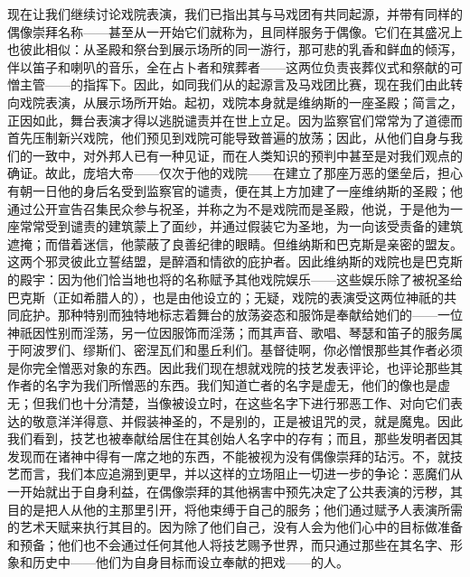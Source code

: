 现在让我们继续讨论戏院表演，我们已指出其与马戏团有共同起源，并带有同样的偶像崇拜名称——甚至从一开始它们就称为，且同样服务于偶像。它们在其盛况上也彼此相似：从圣殿和祭台到展示场所的同一游行，那可悲的乳香和鲜血的倾泻，伴以笛子和喇叭的音乐，全在占卜者和殡葬者——这两位负责丧葬仪式和祭献的可憎主管——的指挥下。因此，如同我们从的起源言及马戏团比赛，现在我们由此转向戏院表演，从展示场所开始。起初，戏院本身就是维纳斯的一座圣殿；简言之，正因如此，舞台表演才得以逃脱谴责并在世上立足。因为监察官们常常为了道德而首先压制新兴戏院，他们预见到戏院可能导致普遍的放荡；因此，从他们自身与我们的一致中，对外邦人已有一种见证，而在人类知识的预判中甚至是对我们观点的确证。故此，庞培大帝——仅次于他的戏院——在建立了那座万恶的堡垒后，担心有朝一日他的身后名受到监察官的谴责，便在其上方加建了一座维纳斯的圣殿；他通过公开宣告召集民众参与祝圣，并称之为不是戏院而是圣殿，他说，于是他为一座常常受到谴责的建筑蒙上了面纱，并通过假装它为圣地，为一向该受责备的建筑遮掩；而借着迷信，他蒙蔽了良善纪律的眼睛。但维纳斯和巴克斯是亲密的盟友。这两个邪灵彼此立誓结盟，是醉酒和情欲的庇护者。因此维纳斯的戏院也是巴克斯的殿宇：因为他们恰当地也将的名称赋予其他戏院娱乐——这些娱乐除了被祝圣给巴克斯（正如希腊人的），也是由他设立的；无疑，戏院的表演受这两位神祇的共同庇护。那种特别而独特地标志着舞台的放荡姿态和服饰是奉献给她们的——一位神祇因性别而淫荡，另一位因服饰而淫荡；而其声音、歌唱、琴瑟和笛子的服务属于阿波罗们、缪斯们、密涅瓦们和墨丘利们。基督徒啊，你必憎恨那些其作者必须是你完全憎恶对象的东西。因此我们现在想就戏院的技艺发表评论，也评论那些其作者的名字为我们所憎恶的东西。我们知道亡者的名字是虚无，他们的像也是虚无；但我们也十分清楚，当像被设立时，在这些名字下进行邪恶工作、对向它们表达的敬意洋洋得意、并假装神圣的，不是别的，正是被诅咒的灵，就是魔鬼。因此我们看到，技艺也被奉献给居住在其创始人名字中的存有；而且，那些发明者因其发现而在诸神中得有一席之地的东西，不能被视为没有偶像崇拜的玷污。不，就技艺而言，我们本应追溯到更早，并以这样的立场阻止一切进一步的争论：恶魔们从一开始就出于自身利益，在偶像崇拜的其他祸害中预先决定了公共表演的污秽，其目的是把人从他的主那里引开，将他束缚于自己的服务；他们通过赋予人表演所需的艺术天赋来执行其目的。因为除了他们自己，没有人会为他们心中的目标做准备和预备；他们也不会通过任何其他人将技艺赐予世界，而只通过那些在其名字、形象和历史中——他们为自身目标而设立奉献的把戏——的人。\par


